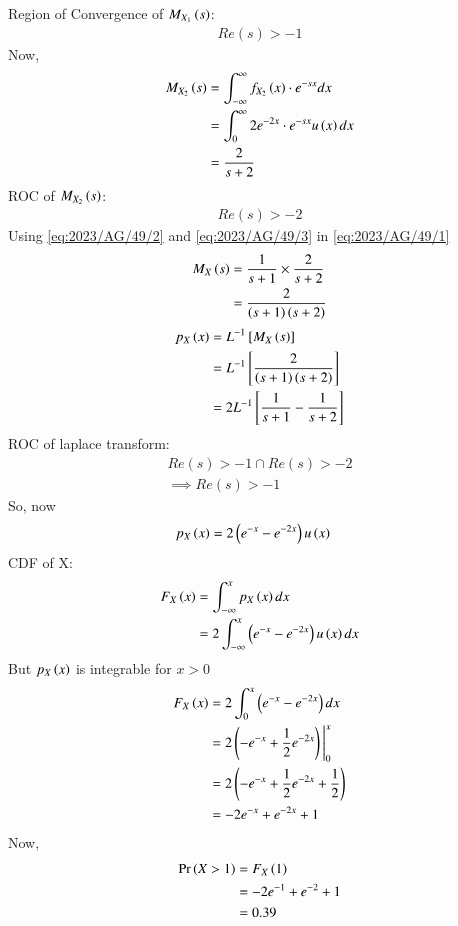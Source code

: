 \documentclass[journal,12pt,twocolumn]{IEEEtran}
\theoremstyle{remark}
\begin{document}
Region of Convergence of $M_{X_1}\left(s\right)$:
\begin{align}
Re(s) > -1
\end{align}
Now,
\begin{align}
M_{X_2}\brak{s} &= \int_{-\infty}^{\infty} f_{X_2}\brak{x}\cdot e^{-sx}dx\\
&=\int_{0}^{\infty} 2e^{-2x}\cdot e^{-sx}u\brak{x}dx\\
&= \frac{2}{s+2}\label{eq:2023/AG/49/3}
\end{align}
ROC of $M_{X_2}\left(s\right)$:
\begin{align}
Re(s) > -2
\end{align}
Using \eqref{eq:2023/AG/49/2} and \eqref{eq:2023/AG/49/3} in \eqref{eq:2023/AG/49/1}
\begin{align}
M_X\left(s\right) &= \frac{1}{s+1} \times \frac{2}{s+2}\\
&= \frac{2}{\left(s+1\right)\left(s+2\right)}
\end{align}
\begin{align}
p_X\left(x\right) &= L^{-1}{}\left[M_X\left(s\right)\right]\\
&= L^{-1}{}\left[\frac{2}{\left(s+1\right)\left(s+2\right)}\right]\\
&= 2L^{-1}{}\left[\frac{1}{s+1}-\frac{1}{s+2}\right]
\end{align}
ROC of laplace transform:
\begin{align}
Re(s)>-1 \cap Re(s)>-2\\
\implies Re(s)>-1 
\end{align}
So, now 
\begin{align}
p_X\left(x\right) &= 2\left(e^{-x}-e^{-2x}\right)u\left(x\right)
\end{align}
CDF of X:
\begin{align}
F_{X}\left(x\right) &= \int_{-\infty}^{x} p_X\left(x\right)dx\\
&= 2\int_{-\infty}^{x}\left(e^{-x}-e^{-2x}\right)u\left(x\right)dx
\end{align}
But $p_X\left(x\right)$ is integrable for $x>0$
\begin{align}
F_{X}\left(x\right) &= 2\int_{0}^{x} \left(e^{-x}-e^{-2x}\right)dx\\
&= 2\left(-e^{-x}+\frac{1}{2}e^{-2x}\right)\Bigg|_{0}^{x}\\
&= 2\left(-e^{-x}+\frac{1}{2}e^{-2x}+\frac{1}{2}\right)\\
&= -2e^{-x}+e^{-2x}+1
\end{align}
Now,
\begin{align}
\Pr\left(X>1\right)&= F_{X}\left(1\right)\\
&= -2e^{-1}+e^{-2}+1\\
&= 0.39
\end{align}
\end{document}
